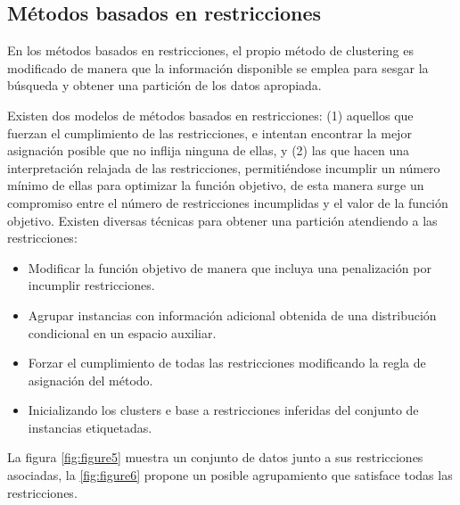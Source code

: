 \subsection{Métodos basados en restricciones}

En los métodos basados en restricciones, el propio método de clustering es modificado de manera que la información disponible se emplea para sesgar la búsqueda y obtener una partición de los datos apropiada.

Existen dos modelos de métodos basados en restricciones: (1) aquellos que fuerzan el cumplimiento de las restricciones, e intentan encontrar la mejor asignación posible que no inflija ninguna de ellas, y (2) las que hacen una interpretación relajada de las restricciones, permitiéndose incumplir un número mínimo de ellas para optimizar la función objetivo, de esta manera surge un compromiso entre el número de restricciones incumplidas y el valor de la función objetivo. Existen diversas técnicas para obtener una partición atendiendo a las restricciones:

\begin{itemize}
	
	\item Modificar la función objetivo de manera que incluya una penalización por incumplir restricciones.
	
	\item Agrupar instancias con información adicional obtenida de una distribución condicional en un espacio auxiliar.
	
	\item Forzar el cumplimiento de todas las restricciones modificando la regla de asignación del método.
	
	\item Inicializando los clusters e base a restricciones inferidas del conjunto de instancias etiquetadas.
	
\end{itemize}

La figura \ref{fig:figure5} muestra un conjunto de datos junto a sus restricciones asociadas, la \ref{fig:figure6} propone un posible agrupamiento que satisface todas las restricciones.

